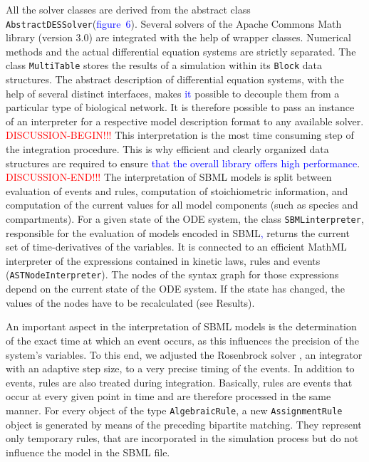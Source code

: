 \documentclass[10pt]{bmc_article}
\newenvironment{bmcformat}{\fussy\setboolean{publ}{true}}{\fussy}
\newcommand{\TODO}[1]{\textcolor{red}{#1}}
\newcommand{\COR}[1]{\textcolor{blue}{#1}}
\newcommand{\AbstractDESSolver}{\texttt{Abstract\-DES\-Solver}\xspace}
\newcommand{\AlgebraicRule}{\texttt{Algebraic\-Rule}\xspace}
\newcommand{\AssignmentRule}{\texttt{Assignment\-Rule}\xspace}
\newcommand{\SBMLinterpreter}{\texttt{SBML\-interpreter}\xspace}
\newcommand{\MultiTable}{\texttt{Multi\-Table}\xspace}
\newcommand{\Block}{\texttt{Block}\xspace}
\newcommand{\ASTNodeInterpreter}{\texttt{ASTNode\-In\-terpreter}\xspace}
\begin{document}
\begin{bmcformat}
All the solver classes are derived from the abstract class \AbstractDESSolver (\COR{figure~6}).
Several solvers of the Apache Commons Math library (version 3.0) \COR{\cite{ApacheCommonsMath2013}} are integrated with the help of wrapper classes.
Numerical methods and the actual differential equation systems are strictly separated.
The class \MultiTable stores the results of a simulation within its \Block data structures. 
%
The abstract description of differential equation systems, with the help of several distinct interfaces, makes \COR{it} possible to decouple them from a particular type of biological network. It is therefore possible to pass an instance of an interpreter for a respective model description format to any available solver.
%
\TODO{DISCUSSION-BEGIN!!!}
This interpretation is the most time consuming step of the integration procedure.
This is why efficient and clearly organized data structures are required to ensure \COR{that the overall library offers high performance}.
\TODO{DISCUSSION-END!!!}
The interpretation of \acs{SBML} models is split between evaluation of events and rules, computation of stoichiometric information, and computation of the current values for all model components (such as species and compartments).
%
For a given state of the ODE system, the class \SBMLinterpreter, responsible
for the evaluation of models encoded in \acs{SBML}\COR{,} returns the current set of
time-derivatives of the variables.
It is connected to an efficient MathML interpreter of the expressions contained
in kinetic laws, rules and events (\ASTNodeInterpreter).
The nodes of the syntax graph for those expressions depend on the current state of the ODE system.
If the state has changed, the values of the nodes have to be recalculated (see Results).

%
An important aspect in the interpretation of \acs{SBML} models is the determination of the exact time at which an event occurs, as this influences the precision of the system's variables.
To this end, we adjusted the Rosenbrock solver \cite{Kotcon2011}, an integrator with an adaptive step size, to a very precise timing of the events. %
% 
In addition to events, rules are also treated during integration.
Basically, rules are events that occur at every given point in time and are therefore processed in the same manner.
For every object of the type \AlgebraicRule, a new \AssignmentRule object is generated by means of the preceding bipartite matching.
They represent only temporary rules, that are incorporated in the simulation process but do not influence the model in the \acs{SBML} file.
%


\end{bmcformat}
\end{document}
